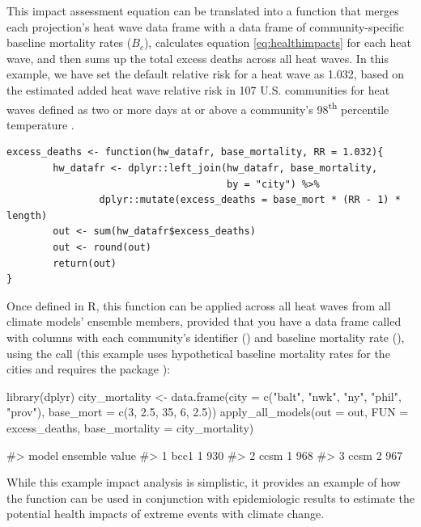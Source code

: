 This impact assessment equation can be translated into a function that
merges each projection's heat wave data frame with a data frame of
community-specific baseline mortality rates (\(B_c\)), calculates
equation \ref{eq:healthimpacts} for each heat wave, and then sums up the
total excess deaths across all heat waves. In this example, we have set
the default relative risk for a heat wave as 1.032, based on the
estimated added heat wave relative risk in 107 U.S. communities for heat
waves defined as two or more days at or above a community's
98\textsuperscript{th} percentile temperature
\citep{anderson2009weather}.

\begin{verbatim}
excess_deaths <- function(hw_datafr, base_mortality, RR = 1.032){
        hw_datafr <- dplyr::left_join(hw_datafr, base_mortality,
                                      by = "city") %>%
                dplyr::mutate(excess_deaths = base_mort * (RR - 1) * length)
        out <- sum(hw_datafr$excess_deaths)
        out <- round(out)
        return(out)
}
\end{verbatim}

\noindent Once defined in R, this function can be applied across all
heat waves from all climate models' ensemble members, provided that you
have a data frame called  with columns with each
community's identifier () and baseline mortality rate
(), using the call (this example uses hypothetical
baseline mortality rates for the cities and requires the 
package \citep{dplyr}):

\begin{Schunk}
\begin{Sinput}
library(dplyr)
city_mortality <- data.frame(city = c("balt", "nwk", "ny", "phil", "prov"),
                             base_mort = c(3, 2.5, 35, 6, 2.5))
apply_all_models(out = out, FUN = excess_deaths, base_mortality = city_mortality)
\end{Sinput}
\begin{Soutput}
#>   model ensemble value
#> 1  bcc1        1   930
#> 2  ccsm        1   968
#> 3  ccsm        2   967
\end{Soutput}
\end{Schunk}

\noindent While this example impact analysis is simplistic, it provides
an example of how the  function can be used in
conjunction with epidemiologic results to estimate the potential health
impacts of extreme events with climate change.

